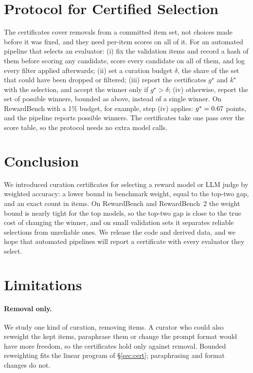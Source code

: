 \documentclass[11pt]{article}
\begin{document}
\section{Protocol for Certified Selection}

The certificates cover removals from a committed item set, not choices made before it was fixed, and they need per-item scores on all of it. For an automated pipeline that selects an evaluator: (i) fix the validation items and record a hash of them before scoring any candidate, score every candidate on all of them, and log every filter applied afterwards; (ii) set a curation budget $\delta$, the share of the set that could have been dropped or filtered; (iii) report the certificates $g^\star$ and $k^\star$ with the selection, and accept the winner only if $g^\star>\delta$; (iv) otherwise, report the set of possible winners, bounded as above, instead of a single winner. On RewardBench with a 1\% budget, for example, step (iv) applies: $g^\star=0.67$ points, and the pipeline reports \OnePlausOneLo{} possible winners. The certificates take one pass over the score table, so the protocol needs no extra model calls.

\section{Conclusion}

We introduced curation certificates for selecting a reward model or LLM judge by weighted accuracy: a lower bound in benchmark weight, equal to the top-two gap, and an exact count in items. On RewardBench and RewardBench~2 the weight bound is nearly tight for the top models, so the top-two gap is close to the true cost of changing the winner, and on small validation sets it separates reliable selections from unreliable ones. We release the code and derived data, and we hope that automated pipelines will report a certificate with every evaluator they select.

\section*{Limitations}

\paragraph{Removal only.} We study one kind of curation, removing items. A curator who could also reweight the kept items, paraphrase them or change the prompt format would have more freedom, so the certificates hold only against removal. Bounded reweighting fits the linear program of \S\ref{sec:cert}; paraphrasing and format changes do not.
\end{document}
